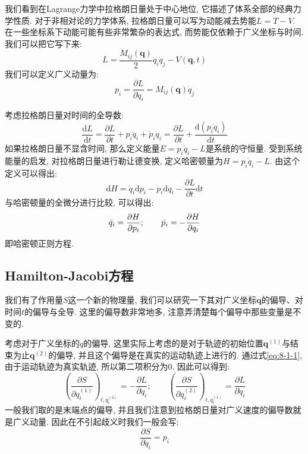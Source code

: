         我们看到在Lagrange力学中拉格朗日量处于中心地位, 它描述了体系全部的经典力学性质. 对于非相对论的力学体系, 拉格朗日量可以写为动能减去势能$L = T - V$. 在一些坐标系下动能可能有些非常繁杂的表达式, 而势能仅依赖于广义坐标与时间. 我们可以把它写下来:
        \begin{equation}
            L =  \frac{M_{ij}(\bm q)}{2} \dot q_i \dot q_j  - V(\bm q, t)
        \end{equation}
        我们可以定义广义动量为: 
        \begin{equation}
            p_i =\frac{\partial L}{\partial \dot q_i} = M_{ij}(\bm q) \dot q_j
        \end{equation}

        \splitline

        考虑拉格朗日量对时间的全导数:
        \begin{equation}
            \frac{\mathrm{d} L}{\mathrm{d} t} = \frac{\partial L}{\partial t} + p_i \ddot q_i + \dot p_i \dot q_i = \frac{\partial L}{\partial t} +  \frac{\mathrm{d} (p_i \dot q_i)}{\mathrm{d} t}
        \end{equation}
        如果拉格朗日量不显含时间, 那么定义能量$E = p_i \dot q_i - L$是系统的守恒量. 
        受到系统能量的启发, 对拉格朗日量进行勒让德变换, 定义哈密顿量为$H = p_i \dot q_i - L$. 
        由这个定义可以得出:
        \begin{equation}
            \mathrm{d} H = \dot q_i \mathrm{d} p_i - \dot p_i \mathrm{d} q_i - \frac{\partial L}{\partial t} \mathrm{d} t
        \end{equation}
        与哈密顿量的全微分进行比较, 可以得出:
        \begin{equation}
            \dot{q_{i}} = \frac{\partial{H}}{\partial{p_i}};
            \qquad
            \dot{p_{i}} = -\frac{\partial{H}}{\partial{q_i}}
        \end{equation}
        即哈密顿正则方程.

        \subsection{Hamilton-Jacobi方程}

        我们有了作用量$S$这一个新的物理量, 我们可以研究一下其对广义坐标$\bm q$的偏导、对时间$t$的偏导与全导. 这里的偏导数非常地多, 注意弄清楚每个偏导中那些变量是不变的. 

        考虑对于广义坐标的$q$的偏导, 这里实际上考虑的是对于轨迹的初始位置$\bm q^{(1)}$与结束为止$\bm q^{(2)}$的偏导, 并且这个偏导是在真实的运动轨迹上进行的. 通过式\ref{eq:8-1-1}, 由于运动轨迹为真实轨迹, 所以第二项积分为0. 因此可以得到: 
        \begin{equation}
            \left( \frac{\partial S}{\partial q_i^{(1)}} \right)_{t, q_i^{(2)}} = - \frac{\partial L}{\partial \dot q_i};
            \qquad
            \left(\frac{\partial S}{\partial q_i^{(2)}}\right)_{t, q_i^{(1)}} = \frac{\partial L}{\partial \dot q_i}
        \end{equation}
        一般我们取的是末端点的偏导, 并且我们注意到拉格朗日量对广义速度的偏导数就是广义动量. 因此在不引起歧义时我们一般会写: 
        \begin{equation}
            \frac{\partial S}{\partial q_i} = p_i
        \end{equation}

